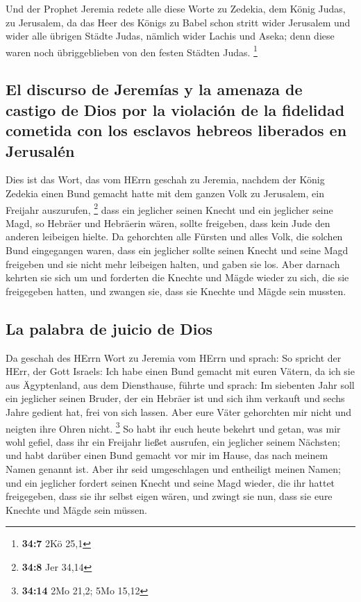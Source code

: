  Und der Prophet Jeremia redete alle diese Worte zu
Zedekia, dem König Judas, zu Jerusalem,  da das Heer des
Königs zu Babel schon stritt wider Jerusalem und wider alle übrigen
Städte Judas, nämlich wider Lachis und Aseka; denn diese waren noch
übriggeblieben von den festen Städten Judas. \footnote{\textbf{34:7} 2Kö
  25,1}

\hypertarget{el-discurso-de-jeremuxedas-y-la-amenaza-de-castigo-de-dios-por-la-violaciuxf3n-de-la-fidelidad-cometida-con-los-esclavos-hebreos-liberados-en-jerusaluxe9n}{%
\subsection{El discurso de Jeremías y la amenaza de castigo de Dios por
la violación de la fidelidad cometida con los esclavos hebreos liberados
en
Jerusalén}\label{el-discurso-de-jeremuxedas-y-la-amenaza-de-castigo-de-dios-por-la-violaciuxf3n-de-la-fidelidad-cometida-con-los-esclavos-hebreos-liberados-en-jerusaluxe9n}}

 Dies ist das Wort, das vom HErrn geschah zu Jeremia,
nachdem der König Zedekia einen Bund gemacht hatte mit dem ganzen Volk
zu Jerusalem, ein Freijahr auszurufen, \footnote{\textbf{34:8} Jer 34,14}
 dass ein jeglicher seinen Knecht und ein jeglicher seine
Magd, so Hebräer und Hebräerin wären, sollte freigeben, dass kein Jude
den anderen leibeigen hielte.  Da gehorchten alle Fürsten
und alles Volk, die solchen Bund eingegangen waren, dass ein jeglicher
sollte seinen Knecht und seine Magd freigeben und sie nicht mehr
leibeigen halten, und gaben sie los.  Aber darnach
kehrten sie sich um und forderten die Knechte und Mägde wieder zu sich,
die sie freigegeben hatten, und zwangen sie, dass sie Knechte und Mägde
sein mussten.

\hypertarget{la-palabra-de-juicio-de-dios}{%
\subsection{La palabra de juicio de
Dios}\label{la-palabra-de-juicio-de-dios}}

 Da geschah des HErrn Wort zu Jeremia vom HErrn und
sprach:  So spricht der HErr, der Gott Israels: Ich habe
einen Bund gemacht mit euren Vätern, da ich sie aus Ägyptenland, aus dem
Diensthause, führte und sprach:  Im siebenten Jahr soll
ein jeglicher seinen Bruder, der ein Hebräer ist und sich ihm verkauft
und sechs Jahre gedient hat, frei von sich lassen. Aber eure Väter
gehorchten mir nicht und neigten ihre Ohren nicht. \footnote{\textbf{34:14}
  2Mo 21,2; 5Mo 15,12}  So habt ihr euch heute bekehrt
und getan, was mir wohl gefiel, dass ihr ein Freijahr ließet ausrufen,
ein jeglicher seinem Nächsten; und habt darüber einen Bund gemacht vor
mir im Hause, das nach meinem Namen genannt ist.  Aber
ihr seid umgeschlagen und entheiligt meinen Namen; und ein jeglicher
fordert seinen Knecht und seine Magd wieder, die ihr hattet freigegeben,
dass sie ihr selbst eigen wären, und zwingt sie nun, dass sie eure
Knechte und Mägde sein müssen.

